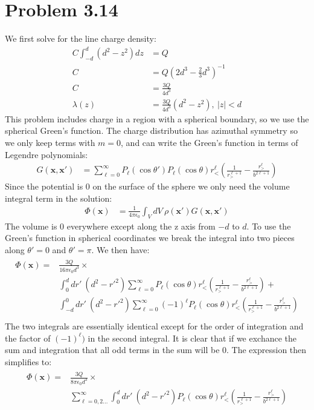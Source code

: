 \documentclass[a4paper,11pt]{article}
\numberwithin{equation}{section}
\newcommand{\bvp}[1]{\mathbf{#1}'}
\newcommand{\bv}[1]{\mathbf{#1}}
\newcommand{\ez}{\epsilon_0}
\newcommand{\lrp}[1]{\left({#1}\right)}
\begin{document}
\section{Problem 3.14}
We first solve for the line charge density:
\begin{align}
 C \int_{-d}^d(d^2-z^2)dz &= Q\\
 C &= Q\lrp{2d^3-\frac{2}{3}d^3}^{-1}\\
 C &= \frac{3Q}{4d^3}\\
 \lambda(z) &= \frac{3Q}{4d^3}(d^2-z^2),\ |z|<d
\end{align}
This problem includes charge in a region with a spherical boundary, so we use the spherical Green's function.
The charge distribution has azimuthal symmetry so we only keep terms with $m=0$, and can write the Green's function in terms of Legendre polynomials:
\begin{align}
 G(\bv{x},\bvp{x}) &= \sum_{\ell=0}^\infty P_\ell(\cos\theta')P_\ell(\cos\theta)r_<^\ell\lrp{\frac{1}{r_>^{\ell+1}}-\frac{r_>^\ell}{b^{2\ell+1}}}
\end{align}
Since the potential is 0 on the surface of the sphere we only need the volume integral term in the solution:
\begin{align}
 \Phi(\bv{x}) &= \frac{1}{4\pi\ez}\int_V dV\ \rho(\bvp{x})G(\bv{x},\bvp{x})
\end{align}
The volume is 0 everywhere except along the z axis from $-d$ to $d$. 
To use the Green's function in spherical coordinates we break the integral into two pieces along $\theta'=0$ and $\theta'=\pi$.
We then have:
\begin{align}
 \begin{split}
 \Phi(\bv{x}) = &\frac{3Q}{16\pi\ez d^3}\times\\
		&\int_0^d dr'\ (d^2-r'^2) \sum_{\ell=0}^\infty P_\ell(\cos\theta)r_<^\ell\lrp{\frac{1}{r_>^{\ell+1}}-\frac{r_>^\ell}{b^{2\ell+1}}}+\\
                &\int_{-d}^0 dr'\ (d^2-r'^2) \sum_{\ell=0}^\infty (-1)^\ell P_\ell(\cos\theta)r_<^\ell\lrp{\frac{1}{r_>^{\ell+1}}-\frac{r_>^\ell}{b^{2\ell+1}}}\\
 \end{split}
\end{align}
The two integrals are essentially identical except for the order of integration and the factor of $(-1)^\ell)$ in the second integral.
It is clear that if we exchance the sum and integration that all odd terms in the sum will be 0. 
The expression then simplifies to:
\begin{align}
 \begin{split}
 \Phi(\bv{x}) = &\frac{3Q}{8\pi\ez d^3}\times\\
		&\sum_{\ell=0,2...}^\infty \int_0^d dr'\ (d^2-r'^2) P_\ell(\cos\theta)r_<^\ell\lrp{\frac{1}{r_>^{\ell+1}}-\frac{r_>^\ell}{b^{2\ell+1}}}\\
 \end{split}
\end{align}
\end{document}
